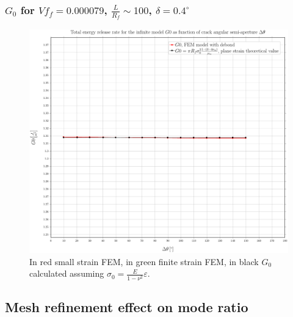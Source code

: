 \documentclass[first,firstsupp,lastsupp,last,hyperref,table]{ETHclass}
\begin{document}
\begin{frame}
\frametitle{\small $G_{0}$ for $Vf_{f}=0.000079$, $\frac{L}{R_{f}}\sim 100$, $\delta=0.4^{\circ}$}
\vspace{-0.5cm}
\begin{figure}
\includegraphics[height=0.7\textheight]{2017-06-16_AbqRunSummary_SingleFiberEqRfSmallStrain-D0-4_G0_Summary.pdf}
 \caption{In red small strain FEM, in green finite strain FEM, in black $G_{0}$ calculated assuming $\sigma_{0}=\frac{E}{1-\nu^ 2}\varepsilon$.}
  \label{fig:jintegral}
\end{figure}
\end{frame}

\subsection{Mesh refinement effect on mode ratio}
\end{document}

